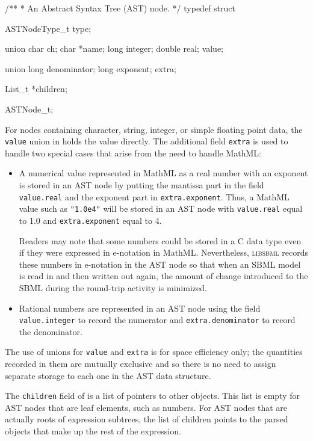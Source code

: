 \documentclass{cekmanual}
\newcommand{\libsbml}{\textsc{libsbml}}
\begin{document}
\begin{example}[c]
/**
 * An Abstract Syntax Tree (AST) node.
 */
typedef struct
{
  ASTNodeType_t type;

  union
  {
    char   ch;
    char   *name;
    long   integer;
    double real;
  } value;    

  union
  {
    long denominator;
    long exponent;
  } extra;

  List_t *children;
} ASTNode_t;
\end{example}

For nodes containing character, string, integer, or simple floating point
data, the \texttt{value} union in  holds the value
directly.  The additional field \texttt{extra} is used to handle two
special cases that arise from the need to handle MathML:

\begin{itemize}
  
\item A numerical value represented in MathML as a real number with an
  exponent is stored in an AST node by putting the mantissa part in the
  field \texttt{value.real} and the exponent part in
  \texttt{extra.exponent}.  Thus, a MathML value such as \texttt{"1.0e4"}
  will be stored in an AST node with \texttt{value.real} equal to 1.0 and
  \texttt{extra.exponent} equal to 4.
  
  Readers may note that some numbers could be stored in a C 
  data type even if they were expressed in e-notation in MathML.
  Nevertheless, \libsbml{} records these numbers in e-notation in the AST
  node so that when an SBML model is read in and then written out again,
  the amount of change introduced to the SBML during the round-trip
  activity is minimized.

\item Rational numbers are represented in an AST node using the field
  \texttt{value.integer} to record the numerator and
  \texttt{extra.denominator} to record the denominator.

\end{itemize}

The use of unions for \texttt{value} and \texttt{extra} is for space
efficiency only; the quantities recorded in them are mutually exclusive and
so there is no need to assign separate storage to each one in the AST data
structure.

The \texttt{children} field of  is a list of pointers to
other  objects.  This list is empty for AST nodes that
are leaf elements, such as numbers.  For AST nodes that are actually roots
of expression subtrees, the list of children points to the parsed objects
that make up the rest of the expression.
\end{document}

